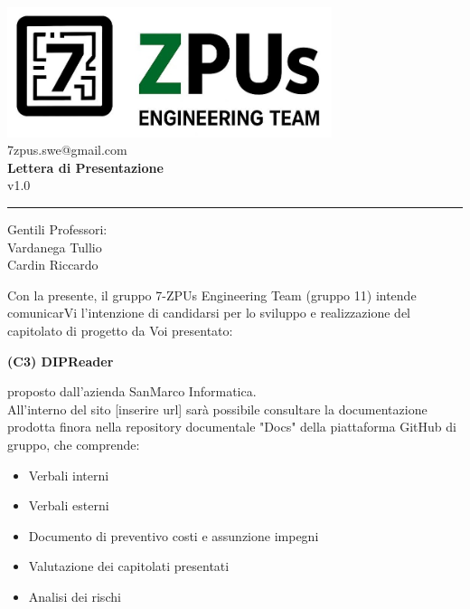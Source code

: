 \documentclass[a4paper,12pt]{article}
\begin{document}
\begin{center}
    \includegraphics[width=9.5cm]{../assets/logo7ZPUS.jpg}\\
    \small\hspace{10cm} 7zpus.swe@gmail.com\\
    \vspace{0.5cm}
    \Large \textbf{Lettera di Presentazione}\\
    \small\hspace{15cm} v1.0\\
\end{center}

\vspace{0.2cm}
\hrule
\vspace{0.7cm}

\begin{flushright}
    Gentili Professori:\\
    \indent Vardanega Tullio\\
    \indent Cardin Riccardo\\
\end{flushright}

Con la presente, il gruppo 7-ZPUs Engineering Team (gruppo 11) intende comunicarVi l'intenzione di candidarsi per lo sviluppo e realizzazione del capitolato di progetto da Voi presentato:
\begin{center}
    \textbf{(C3) DIPReader}\\
\end{center}
proposto dall'azienda SanMarco Informatica.\\
All'interno del sito [inserire url] sarà possibile consultare la documentazione prodotta finora nella repository documentale "Docs" della piattaforma GitHub di gruppo, che comprende:
\begin{itemize}[noitemsep]
    \item Verbali interni
    \item Verbali esterni
    \item Documento di preventivo costi e assunzione impegni
    \item Valutazione dei capitolati presentati
    \item Analisi dei rischi
\end{itemize}
\end{document}

